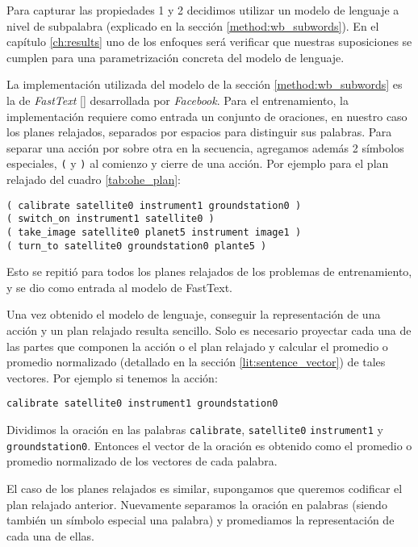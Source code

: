 Para capturar las propiedades 1 y 2 decidimos utilizar un modelo de lenguaje a
nivel de subpalabra (explicado en la sección \ref{method:wb_subwords}). En el
capítulo \ref{ch:results} uno de los enfoques será verificar que nuestras
suposiciones se cumplen para una parametrización concreta del modelo de
lenguaje.

La implementación utilizada del modelo de la sección \ref{method:wb_subwords} es
la de \emph{FastText} \ref{} desarrollada por \emph{Facebook}. Para el
entrenamiento, la implementación requiere como entrada un conjunto de oraciones,
en nuestro caso los planes relajados, separados por espacios para distinguir sus
palabras. Para separar una acción por sobre otra en la secuencia, agregamos
además 2 símbolos especiales, \verb|(| y \verb|)| al comienzo y cierre de una
acción. Por ejemplo para el plan relajado del cuadro \ref{tab:ohe_plan}:

\begin{center}
    \verb|( calibrate satellite0 instrument1 groundstation0 )| \\
    \verb|( switch_on instrument1 satellite0 )| \\
    \verb|( take_image satellite0 planet5 instrument image1 )| \\
    \verb|( turn_to satellite0 groundstation0 plante5 )|
\end{center}

Esto se repitió para todos los planes relajados de los problemas de
entrenamiento, y se dio como entrada al modelo de FastText.

Una vez obtenido el modelo de lenguaje, conseguir la representación de una
acción y un plan relajado resulta sencillo. Solo es necesario proyectar cada una
de las partes que componen la acción o el plan relajado y calcular el promedio o
promedio normalizado (detallado en la sección \ref{lit:sentence_vector}) de
tales vectores. Por ejemplo si tenemos la acción:

\begin{center}
    \verb|calibrate satellite0 instrument1 groundstation0|    
\end{center}

Dividimos la oración en las palabras \verb|calibrate|,  \verb|satellite0|
\verb|instrument1| y \verb|groundstation0|. Entonces el vector de la oración es
obtenido como el promedio o promedio normalizado de los vectores de cada
palabra.

El caso de los planes relajados es similar, supongamos que queremos codificar el
plan relajado anterior. Nuevamente separamos la oración en palabras (siendo
también un símbolo especial una palabra) y promediamos la representación de cada
una de ellas.


